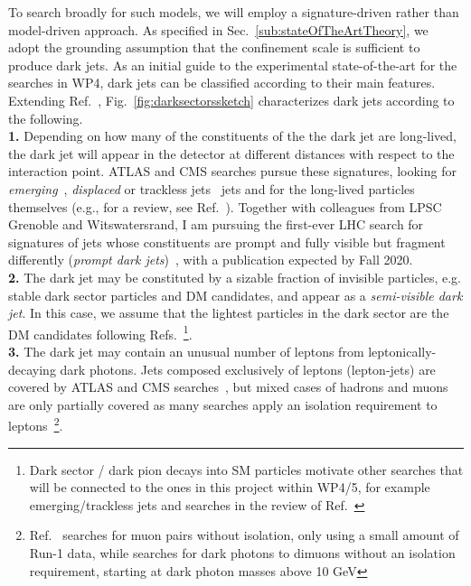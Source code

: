 To search broadly for such models, we will employ a signature-driven rather than model-driven approach.
As specified in Sec.~\ref{sub:stateOfTheArtTheory}, we adopt the grounding assumption that the confinement scale is sufficient to produce dark jets. 
As an initial guide to the experimental state-of-the-art for the searches in WP4, dark jets can be classified according to their main features. 
Extending Ref.~\cite{Cohen:2017pzm,Park:2017rfb}, Fig.~\ref{fig:darksectorssketch} characterizes dark jets according to the following.  
\\
\indent
\textbf{1.} Depending on how many of the constituents of the the dark jet are long-lived, the dark jet will appear in the detector at different distances with respect to the interaction point. ATLAS and CMS searches pursue these signatures, looking for \textit{emerging}~\cite{Schwaller:2015gea,Sirunyan:2018njd}, \textit{displaced} or {trackless jets}~\cite{Aaboud:2019opc,Sirunyan:2018vlw,DeBruyn:2018cdo} jets and for the long-lived particles themselves (e.g.\cite{Sirunyan:2019nfw}, for a review, see Ref.~\cite{Lee:2018pag}). Together with colleagues from LPSC Grenoble and Witswatersrand, I am pursuing the first-ever LHC search for signatures of jets whose constituents are prompt and fully visible but fragment differently (\textit{prompt dark jets})~\cite{Park:2017rfb}, with a publication expected by Fall 2020. 
\\
\indent
\textbf{2.} The dark jet may be constituted by a sizable fraction of invisible particles, e.g. stable dark sector particles and DM candidates, and appear as a \textit{semi-visible dark jet}. In this case, we assume that the lightest particles in the dark sector are the DM candidates following Refs.~\cite{Cohen:2017pzm,Park:2017rfb,Bernreuther:2019pfb}\footnote{Dark sector / dark pion decays into SM particles motivate other searches that will be connected to the ones in this project within WP4/5, for example emerging/trackless jets and searches in the review of Ref.~\cite{Kribs:2018ilo}}.%
\\
\indent
\textbf{3.}  The dark jet may contain an unusual number of leptons from leptonically-decaying dark photons. Jets composed exclusively of leptons (lepton-jets) are covered by ATLAS and CMS searches~\cite{Aad:2019tua,EXOT-2014-09,Khachatryan:2015wka}, %
but mixed cases of hadrons and muons are only partially covered as many searches apply an isolation requirement to leptons~\footnote{Ref.~\cite{Chatrchyan:2011hr} searches for muon pairs without isolation, only using a small amount of Run-1 data, while \cite{Sirunyan:2019wqq} searches for dark photons to dimuons without an isolation requirement, starting at dark photon masses above 10 GeV}. %

